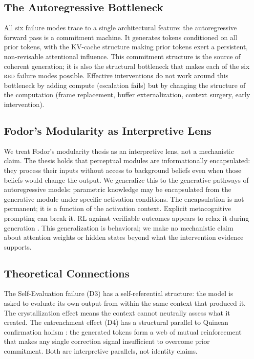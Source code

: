 \documentclass[11pt]{article}
\newcommand{\rbd}{\textsc{rbd}}
\begin{document}
\subsection{The Autoregressive Bottleneck}

All six failure modes trace to a single architectural feature: the
autoregressive forward pass is a commitment machine. It generates tokens
conditioned on all prior tokens, with the KV-cache structure making prior
tokens exert a persistent, non-revisable attentional influence. This
commitment structure is the source of coherent generation; it is also the
structural bottleneck that makes each of the six \rbd{} failure modes
possible. Effective interventions do not work around this bottleneck by
adding compute (escalation fails) but by changing the structure of the
computation (frame replacement, buffer externalization, context surgery,
early intervention).

\subsection{Fodor's Modularity as Interpretive Lens}

We treat Fodor's modularity thesis as an interpretive lens, not a
mechanistic claim. The thesis holds that perceptual modules are
informationally encapsulated: they process their inputs without access
to background beliefs even when those beliefs would change the output.
We generalize this to the generative pathways of autoregressive models:
parametric knowledge may be encapsulated from the generative module under
specific activation conditions. The encapsulation is not permanent; it
is a function of the activation context. Explicit metacognitive prompting
can break it. RL against verifiable outcomes appears to relax it during
generation \citep{deepseek2025incentivizing,kimi2025scaling}. This
generalization is behavioral; we make no mechanistic claim about attention
weights or hidden states beyond what the intervention evidence supports.

\subsection{Theoretical Connections}

The Self-Evaluation failure (D3) has a self-referential structure: the
model is asked to evaluate its own output from within the same context
that produced it. The crystallization effect means the context cannot
neutrally assess what it created. The entrenchment effect (D4) has a
structural parallel to Quinean confirmation holism
\citep{quine1951two}: the generated tokens form a web of mutual
reinforcement that makes any single correction signal insufficient to
overcome prior commitment. Both are interpretive parallels, not identity
claims.
\end{document}
